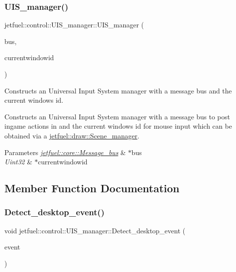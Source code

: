 \subsubsection{\texorpdfstring{U\+I\+S\+\_\+manager()}{UIS\_manager()}}
{\footnotesize\ttfamily jetfuel\+::control\+::\+U\+I\+S\+\_\+manager\+::\+U\+I\+S\+\_\+manager (\begin{DoxyParamCaption}\item[{\hyperlink{classjetfuel_1_1core_1_1Message__bus}{jetfuel\+::core\+::\+Message\+\_\+bus} $\ast$}]{bus,  }\item[{Uint32 $\ast$}]{currentwindowid }\end{DoxyParamCaption})}



Constructs an Universal Input System manager with a message bus and the current window\textquotesingle{}s id. 

Constructs an Universal Input System manager with a message bus to post ingame actions in and the current window\textquotesingle{}s id for mouse input which can be obtained via a \hyperlink{classjetfuel_1_1draw_1_1Scene__manager}{jetfuel\+::draw\+::\+Scene\+\_\+manager}.


\begin{DoxyParams}{Parameters}
{\em \hyperlink{classjetfuel_1_1core_1_1Message__bus}{jetfuel\+::core\+::\+Message\+\_\+bus}} & $\ast$bus \\
\hline
{\em Uint32} & $\ast$currentwindowid \\
\hline
\end{DoxyParams}


\subsection{Member Function Documentation}
\mbox{\label{classjetfuel_1_1control_1_1UIS__manager_aed8de35f5209e88eda4dbb87c313420c}} 
\subsubsection{\texorpdfstring{Detect\+\_\+desktop\+\_\+event()}{Detect\_desktop\_event()}}
{\footnotesize\ttfamily void jetfuel\+::control\+::\+U\+I\+S\+\_\+manager\+::\+Detect\+\_\+desktop\+\_\+event (\begin{DoxyParamCaption}\item[{S\+D\+L\+\_\+\+Event $\ast$}]{event }\end{DoxyParamCaption})\hspace{0.3cm}{\ttfamily [protected]}}



